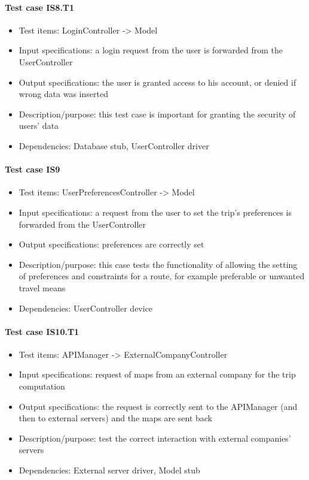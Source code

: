\documentclass[a4paper,leqno]{article}
\begin{document}
\paragraph{Test case IS8.T1}
\begin{itemize}
	\item Test items: LoginController -> Model
	\item Input specifications: a login request from the user is forwarded from the UserController
	\item Output specifications: the user is granted access to his account, or denied if wrong data was inserted
	\item Description/purpose: this test case is important for granting the security of users' data
	\item Dependencies: Database stub, UserController driver
\end{itemize}

\paragraph{Test case IS9}
\begin{itemize}
	\item Test items: UserPreferencesController -> Model
	\item Input specifications: a request from the user to set the trip's preferences is forwarded from the UserController
	\item Output specifications: preferences are correctly set
	\item Description/purpose: this case tests the functionality of allowing the setting of preferences and constraints for a route, for example preferable or unwanted travel means
	\item Dependencies: UserController device
\end{itemize}

\paragraph{Test case IS10.T1}
\begin{itemize}
	\item Test items: APIManager -> ExternalCompanyController
	\item Input specifications: request of maps from an external company for the trip computation
	\item Output specifications: the request is correctly sent to the APIManager (and then to external servers) and the maps are sent back
	\item Description/purpose: test the correct interaction with external companies' servers
	\item Dependencies: External server driver, Model stub
\end{itemize}
\end{document}
